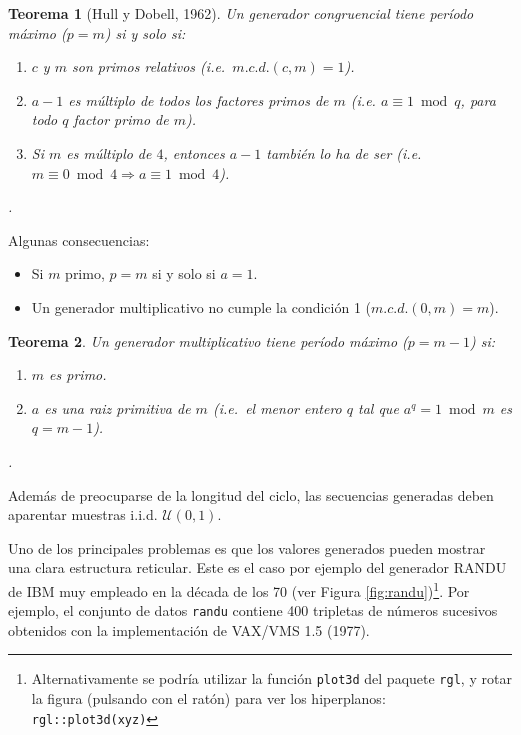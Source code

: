 \documentclass[
]{book}
\theoremstyle{break}
\newtheorem{theorem}{Teorema}[chapter]
\theoremstyle{definition}
\theoremstyle{definition}
\theoremstyle{definition}
\theoremstyle{definition}
\theoremstyle{remark}
\begin{document}
\begin{theorem}[Hull y Dobell, 1962]
\protect\hypertarget{thm:hull-dobell}{}{\label{thm:hull-dobell} {} }
Un generador congruencial tiene período máximo (\(p=m\)) si y solo si:

\begin{enumerate}
\def\labelenumi{\arabic{enumi}.}
\item
  \(c\) y \(m\) son primos relativos (i.e.~\(m.c.d.(c, m) = 1\)).
\item
  \(a-1\) es múltiplo de todos los factores primos de \(m\) (i.e.
  \(a \equiv 1 \bmod q\), para todo \(q\) factor primo de \(m\)).
\item
  Si \(m\) es múltiplo de \(4\), entonces \(a-1\) también lo ha de
  ser (i.e.~\(m \equiv 0 \bmod 4\Rightarrow a \equiv 1 \bmod 4\)).
\end{enumerate}

.\\
\end{theorem}

Algunas consecuencias:

\begin{itemize}
\item
  Si \(m\) primo, \(p=m\) si y solo si \(a=1\).
\item
  Un generador multiplicativo no cumple la condición 1 (\(m.c.d.(0, m)=m\)).
\end{itemize}

\begin{theorem}
\protect\hypertarget{thm:unnamed-chunk-3}{}{\label{thm:unnamed-chunk-3} }
Un generador multiplicativo tiene período máximo (\(p=m-1\)) si:

\begin{enumerate}
\def\labelenumi{\arabic{enumi}.}
\item
  \(m\) es primo.
\item
  \(a\) es una raiz primitiva de \(m\) (i.e.~el menor entero \(q\) tal
  que \(a^{q}=1 \bmod m\) es \(q=m-1\)).
\end{enumerate}

.\\
\end{theorem}

Además de preocuparse de la longitud del ciclo, las secuencias
generadas deben aparentar muestras i.i.d. \(\mathcal{U}(0,1)\).

Uno de los principales problemas es que los valores generados pueden mostrar una clara estructura reticular.
Este es el caso por ejemplo del generador RANDU de IBM muy empleado en la década de los 70 (ver Figura \ref{fig:randu})\footnote{Alternativamente se podría utilizar la función \texttt{plot3d} del paquete \texttt{rgl}, y rotar la figura (pulsando con el ratón) para ver los hiperplanos:
  \texttt{rgl::plot3d(xyz)}}.
Por ejemplo, el conjunto de datos \texttt{randu} contiene 400 tripletas de números sucesivos obtenidos con la implementación de VAX/VMS 1.5 (1977).
\end{document}
